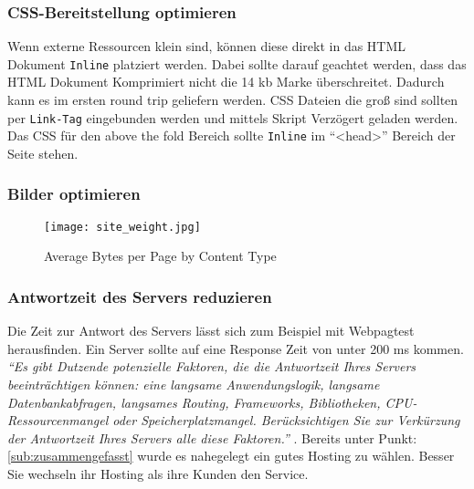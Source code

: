 		\subsubsection{CSS-Bereitstellung optimieren} %
		\label{ssub:css_bereitstellung_optimieren}
			Wenn externe Ressourcen klein sind, können diese direkt in das HTML Dokument \texttt{Inline} platziert werden. Dabei sollte darauf geachtet werden, dass das HTML Dokument Komprimiert nicht die 14 kb Marke überschreitet. Dadurch kann es im ersten round trip geliefern werden. CSS Dateien die groß sind sollten per \texttt{Link-Tag} eingebunden werden und mittels Skript Verzögert geladen werden. Das CSS für den above the fold Bereich sollte \texttt{Inline} im "`<head>"' Bereich der Seite stehen. 

		\subsubsection{Bilder optimieren} %
		\label{ssub:bilder_optimieren}

		\begin{figure}[htbp]
			\begin{center}
				\texttt{[image: site\_weight.jpg]}
				\caption{Average Bytes per Page by Content Type \autocite{httpArchive}}
				\label{fig:site_weight}
			\end{center}
		\end{figure}
		

		\subsubsection{Antwortzeit des Servers reduzieren} %
		\label{ssub:antwortzeit_des_servers_reduzieren}
			Die Zeit zur Antwort des Servers lässt sich zum Beispiel mit Webpagtest herausfinden. Ein Server sollte auf eine Response Zeit von unter 200 ms kommen. \textit{"`Es gibt Dutzende potenzielle Faktoren, die die Antwortzeit Ihres Servers beeinträchtigen können: eine langsame Anwendungslogik, langsame Datenbankabfragen, langsames Routing, Frameworks, Bibliotheken, CPU-Ressourcenmangel oder Speicherplatzmangel. Berücksichtigen Sie zur Verkürzung der Antwortzeit Ihres Servers alle diese Faktoren."'} \autocite{google15}. Bereits unter Punkt: \ref{sub:zusammengefasst} wurde es nahegelegt ein gutes Hosting zu wählen. Besser Sie wechseln ihr Hosting als ihre Kunden den Service.

